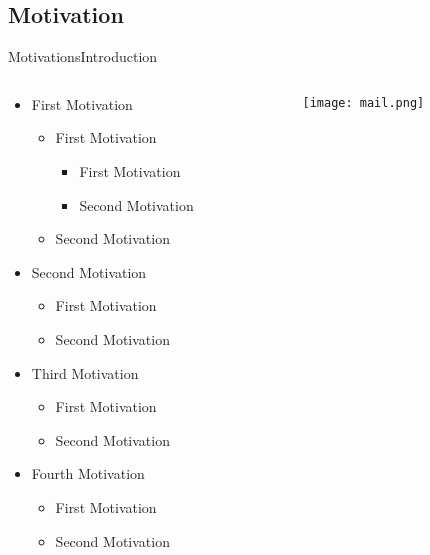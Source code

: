 

\subsection*{Motivation}
\begin{frame}{Motivations}{Introduction} %
	\begin{columns}
		\begin{column}{0.5\textwidth}
					\begin{itemize}
				\item First Motivation
					\begin{itemize}
						\item First Motivation
						\begin{itemize}
							\item First Motivation
							\item Second Motivation
						\end{itemize}
						\item Second Motivation
					\end{itemize}
				\item Second Motivation
					\begin{itemize}
						\item First Motivation
						\item Second Motivation
					\end{itemize}
				\item Third Motivation
					\begin{itemize}
						\item First Motivation
						\item Second Motivation
					\end{itemize}
				\item Fourth Motivation
					\begin{itemize}
						\item First Motivation
						\item Second Motivation
					\end{itemize}
				\end{itemize}
							\end{column}
					\begin{column}{0.5\textwidth}
				\begin{center}
									\begin{figure}
						\texttt{[image: mail.png]}
						\caption{\label{fig:}}
					\end{figure}

\end{center}
\end{column}
\end{columns}
\end{frame}
